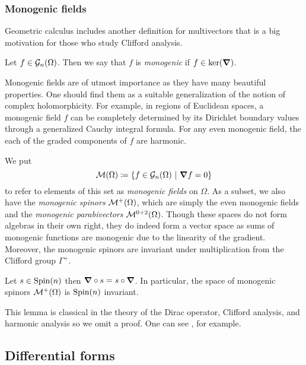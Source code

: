 \subsubsection{Monogenic fields}

Geometric calculus includes another definition for multivectors that is a big motivation for those who study Clifford analysis. 
\begin{definition}
 Let $f \in \mathcal{G}_n(\Omega)$. Then we say that $f$ is \emph{monogenic} if $f \in \ker(\boldsymbol{\nabla})$.
\end{definition}

Monogenic fields are of utmost importance as they have many beautiful properties. One should find them as a suitable generalization of the notion of complex holomorphicity. For example, in regions of Euclidean spaces, a monogenic field $f$ can be completely determined by its Dirichlet boundary values through a generalized Cauchy integral formula. For any even monogenic field, the each of the graded components of $f$ are harmonic.  

We put 
\[
\mathcal{M}(\Omega) \coloneqq \{f \in \mathcal{G}_n(\Omega) ~\vert~ \boldsymbol{\nabla} f =0\}
\]
to refer to elements of this set as \emph{monogenic fields} on $\Omega$. As a subset, we also have the \emph{monogenic spinors} $\mathcal{M}^+(\Omega)$, which are simply the even monogenic fields and the \emph{monogenic parabivectors} $\mathcal{M}^{0+2}(\Omega)$. Though these spaces do not form algebras in their own right, they do indeed form a vector space as sums of monogenic functions are monogenic due to the linearity of the gradient.  Moreover, the monogenic spinors are invariant under multiplication from the Clifford group $\Gamma^+$.

\begin{lemma}
\label{lem:clifford_invariant}
Let $s\in \operatorname{Spin}(n)$ then $\boldsymbol{\nabla} \circ s = s \circ \boldsymbol{\nabla}$.  In particular, the space of monogenic spinors $\mathcal{M}^+(\Omega)$ is $\operatorname{Spin}(n)$ invariant.
\end{lemma}
This lemma is classical in the theory of the Dirac operator, Clifford analysis, and harmonic analysis so we omit a proof.  One can see \cite{janssens_special_nodate}, for example.

\subsection{Differential forms}
\label{subsec:diff_forms}

